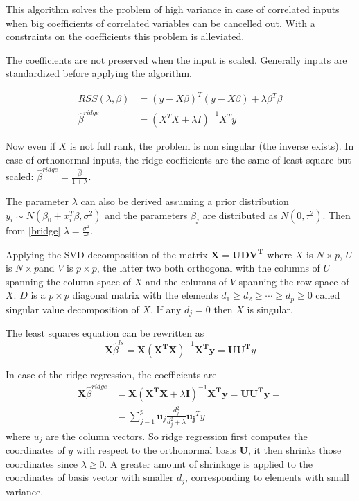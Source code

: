 \documentclass[12pt, letterpaper]{article}
\theoremstyle{definition}
\begin{document}
This algorithm solves the problem of high variance in case of correlated inputs when big coefficients of correlated variables can be cancelled out. With a constraints on the coefficients this problem is alleviated.

The coefficients are not preserved when the input is scaled. Generally inputs are standardized before applying the algorithm.

\begin{align}
RSS(\lambda, \beta)       &= \left( y - X \beta \right)^T \left( y - X\beta \right) + \lambda \beta^T \beta \\
\hat{\beta}^{ridge} &= \left( X^TX + \lambda I \right)^{-1} X^Ty
\end{align}

Now even if $X$ is not full rank, the problem is non singular (the inverse exists).
In case of orthonormal inputs, the ridge coefficients are the same of least square but scaled: $\hat{\beta}^{ridge}  = \frac{\hat{\beta}}{1+\lambda}$.

The parameter $\lambda$ can also be derived assuming a prior distribution $y_i  \sim  N\left( \beta_0+x_i^T\beta, \sigma^2\right)$ and the parameters $\beta_j$ are distributed as $N\left( 0, \tau^2\right)$. Then from \ref{bridge} $\lambda = \frac{\sigma^2}{\tau^2}$.

Applying the SVD decomposition of the matrix $\mathbf{X =  UDV^T}$ where $X$ is $N\times p$, $U$ is $N\times p$and $V$ is $p\times p$, the latter two both orthogonal with the columns of $U$ spanning the column space of $X$ and the columns of $V$ spanning the row space of $X$. $D$ is a $p\times p$ diagonal matrix with the elements $d_1\ge d_2 \ge \cdots \ge d_p\ge 0$ called singular value decomposition of $X$. If any $d_j = 0$ then $X$ is singular.

The least squares equation can be rewritten as 
\begin{equation}
\mathbf{X}\hat{\beta}^{ls}  = \mathbf{X\left( X^TX\right)}^{-1}\mathbf{X^Ty} = \mathbf{UU^T}y
\end{equation}

In case of the ridge regression, the coefficients are
\begin{equation}
\begin{aligned}
\mathbf{X}\hat{\beta}^{ridge}  &= \mathbf{X}\left( \mathbf{X^TX} +\lambda \mathbf{I} \right)^{-1}\mathbf{X^Ty} = \mathbf{UU^Ty} =\\
&= \sum_{j-1}^p \mathbf{u}_j \frac{d_j^2}{d_j^2+\lambda} \mathbf{u_j}^Ty
\end{aligned}
\end{equation}
where $u_j$ are the column vectors. So ridge regression first computes the coordinates of $y$ with respect to the orthonormal basis $\mathbf{U}$, it then shrinks those coordinates since $\lambda\ge0$. A greater amount of shrinkage is applied to the coordinates of basis vector with smaller $d_j$, corresponding to elements with small variance.
\end{document}
